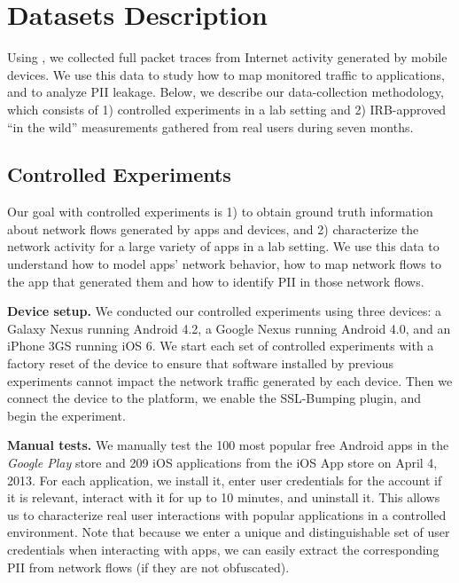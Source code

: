 \section{Datasets Description}
\label{sec:dataset}
Using \platname, we collected full packet traces from Internet activity generated by
mobile devices. We use this data to study how to map monitored traffic to applications, and to
analyze PII leakage. Below, we describe our data-collection methodology, which consists of
1) controlled experiments in a lab setting and 2) IRB-approved ``in the wild'' measurements 
gathered from real users during seven months.

\subsection{Controlled Experiments}
\label{sec:dataset-contr-exper}
Our goal with controlled experiments is 1) to obtain ground truth information 
about network flows generated by apps and devices, and 2) characterize the 
network activity for a large variety of apps in a lab setting. We use 
this data to understand how to model apps' network behavior, how to map network flows 
to the app that generated them and how to identify PII in those network flows. 

\noindent\textbf{Device setup.} We conducted our controlled experiments using three devices: a Galaxy
Nexus running Android 4.2, a Google Nexus running Android 4.0, and
an iPhone 3GS running iOS 6. We start each set of controlled experiments
 with a factory reset of the device to ensure that software installed by previous 
 experiments cannot impact the network traffic generated by each device. 
 Then we connect the device to the
\platname{} platform, we enable the SSL-Bumping plugin, and begin
the experiment. 

\noindent\textbf{Manual tests.} We manually test the
100 most popular free Android apps in the \emph{Google Play} store and 209
iOS applications from the iOS App store on April 4, 2013. For each
application, we install it, enter user credentials for the account if
it is relevant, interact with it for up to 10 minutes, and uninstall
it. This allows us to characterize real user interactions with popular applications 
in a controlled environment. Note that 
because we enter a unique and distinguishable set of user credentials when 
interacting with apps, we can easily extract the corresponding PII from 
network flows (if they are not obfuscated).

